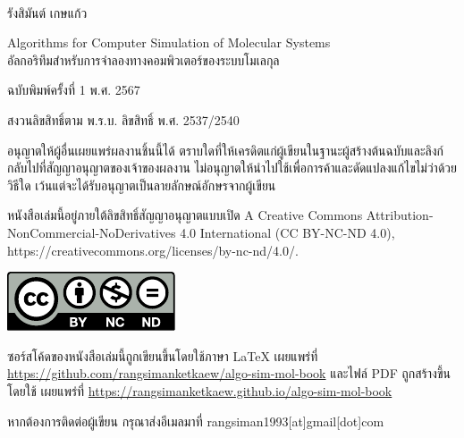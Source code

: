

{
~\vfill
\thispagestyle{empty}
\setlength{\parindent}{0em}

รังสิมันต์ เกษแก้ว

Algorithms for Computer Simulation of Molecular Systems\\
อัลกอริทึมสำหรับการจำลองทางคอมพิวเตอร์ของระบบโมเลกุล

\bigskip

\par{ฉบับพิมพ์ครั้งที่ 1 พ.ศ. 2567}

สงวนลิขสิทธิ์ตาม พ.ร.บ. ลิขสิทธิ์ พ.ศ. 2537/2540

อนุญาตให้ผู้อื่นเผยแพร่ผลงานชิ้นนี้ได้ ตราบใดที่ให้เครดิตแก่ผู้เขียนในฐานะผู้สร้างต้นฉบับและลิงก์กลับไปที่สัญญาอนุญาตของเจ้าของผลงาน 
ไม่อนุญาตให้นำไปใช้เพื่อการค้าและดัดแปลงแก้ไขไม่ว่าด้วยวิธีใด เว้นแต่จะได้รับอนุญาตเป็นลายลักษณ์อักษรจากผู้เขียน

หนังสือเล่มนี้อยู่ภายใต้ลิขสิทธิ์สัญญาอนุญาตแบบเปิด A Creative Commons Attribution-NonCommercial-NoDerivatives 4.0 
International (CC BY-NC-ND 4.0), https://creativecommons.org/licenses/by-nc-nd/4.0/.

\includegraphics[scale=1.2]{front_matter/by-nc-nd.pdf}

\bigskip

ซอร์สโค้ดของหนังสือเล่มนี้ถูกเขียนขึ้นโดยใช้ภาษา {\selectfont \LaTeX} เผยแพร่ที่ 
\url{https://github.com/rangsimanketkaew/algo-sim-mol-book} และไฟล์ PDF ถูกสร้างขึ้นโดยใช้ {\selectfont 
\XeLaTeX} เผยแพร่ที่ \url{https://rangsimanketkaew.github.io/algo-sim-mol-book}

หากต้องการติดต่อผู้เขียน กรุณาส่งอีเมลมาที่ rangsiman1993[at]gmail[dot]com
}
